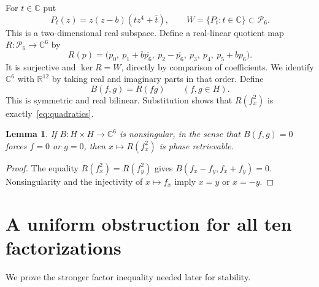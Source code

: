 \documentclass[11pt]{article}
\newtheorem{lemma}[theorem]{Lemma}
\theoremstyle{remark}\newtheorem{remark}[theorem]{Remark}
\newcommand{\R}{\mathbb R}\newcommand{\C}{\mathbb C}
\begin{document}
For $t\in\C$ put
\begin{equation}\label{eq:kernel}
 P_t(z)=z(z-b)(t z^4+\overline t),\qquad
 W=\{P_t:t\in\C\}\subset\mathcal P_6.
\end{equation}
This is a two-dimensional real subspace. Define a real-linear quotient map $R:\mathcal P_6\to\C^6$ by
\begin{equation}\label{eq:quotient}
 R(p)=\bigl(p_0,\ p_1+b\overline{p_6},\ p_2-\overline{p_6},\
 p_3,\ p_4,\ p_5+b p_6\bigr).
\end{equation}
It is surjective and $\ker R=W$, directly by comparison of coefficients. We identify $\C^6$ with $\R^{12}$ by taking real and imaginary parts in that order. Define
\[
 B(f,g)=R(fg)\qquad(f,g\in H).
\]
This is symmetric and real bilinear. Substitution shows that $R(f_x^2)$ is exactly~\eqref{eq:quadratics}.

\begin{lemma}\label{lem:bilinear}
If $B:H\times H\to\C^6$ is nonsingular, in the sense that $B(f,g)=0$ forces $f=0$ or $g=0$, then $x\mapsto R(f_x^2)$ is phase retrievable.
\end{lemma}
\begin{proof}
The equality $R(f_x^2)=R(f_y^2)$ gives
$B(f_x-f_y,f_x+f_y)=0$. Nonsingularity and the injectivity of $x\mapsto f_x$ imply $x=y$ or $x=-y$.
\end{proof}

\section{A uniform obstruction for all ten factorizations}
We prove the stronger factor inequality needed later for stability.
\end{document}
